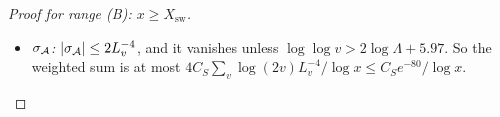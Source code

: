\begin{proof}[Proof for range \textup{(B)}: $x\ge X_{\mathrm{sw}}$]
\begin{itemize}
\[    \le1.01\,\delta\gamma_j\kappa_j(v/x_j)^{\theta-1},
  \]
  as $\delta\le X_0^{-1/2}$, $\epsilon_j\le2x_j^{-0.99}$ (as $H(x)\le x^{0.01}$) and $6/\gamma_j\le6e^{-X_0^2/3}$, so the three factors multiply to at most $1+10^{-6}$. Summed with the weights $\mu^2(n)/n$ over $n\le x/x_j$, this is at
  most $1.01F_\theta\,\delta\gamma_j\kappa_j\le2\delta\gamma_j\kappa_j/(1-\theta)\le2\kappa_j/((1-\theta)\gamma_j\log^4x)$, as $F_\theta\le1.33$
  and $\delta\gamma_j^2\le\log^{-4}x$ for resolvable $\gamma_j\le\gamma_*$. This is summable over $j$.
\item \emph{$\sigma_{\mathcal{A}}$:} $|\sigma_{\mathcal{A}}|\le2L_v^{-4}$, and it vanishes unless $\log\log v>2\log\Lambda+5.97$. So the
  weighted sum is at most $4C_S\sum_v\log(2v)L_v^{-4}/\log x\le C_Se^{-80}/\log x$.
\end{itemize}


\end{proof}
